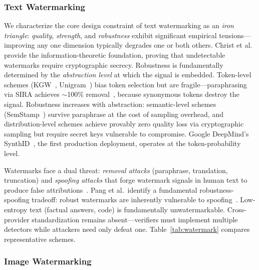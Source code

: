 \subsubsection{Text Watermarking}
\label{sec:wm-text}

We characterize the core design constraint of text watermarking as an \emph{iron triangle}: \emph{quality}, \emph{strength}, and \emph{robustness} exhibit significant empirical tensions---improving any one dimension typically degrades one or both others. Christ et al.~\cite{christ2024undetectable} provide the information-theoretic foundation, proving that undetectable watermarks require cryptographic secrecy. Robustness is fundamentally determined by the \emph{abstraction level} at which the signal is embedded. Token-level schemes (KGW~\cite{kirchenbauer2023kgw}, Unigram~\cite{zhao2023unigram}) bias token selection but are fragile---paraphrasing via SIRA achieves $\sim$100\% removal~\cite{cheng2025sira}, because synonymous tokens destroy the signal. Robustness increases with abstraction: semantic-level schemes (SemStamp~\cite{hou2023semstamp}) survive paraphrase at the cost of sampling overhead, and distribution-level schemes achieve provably zero quality loss via cryptographic sampling but require secret keys vulnerable to compromise. Google DeepMind's SynthID~\cite{synthidtext2024}, the first production deployment, operates at the token-probability level.

Watermarks face a dual threat: \emph{removal attacks} (paraphrase, translation, truncation) and \emph{spoofing attacks} that forge watermark signals in human text to produce false attributions~\cite{sadasivan2023spoofing}. Pang et al.\ identify a fundamental robustness-spoofing tradeoff: robust watermarks are inherently vulnerable to spoofing~\cite{pang2024nofree}. Low-entropy text (factual answers, code) is fundamentally unwatermarkable. Cross-provider standardization remains absent---verifiers must implement multiple detectors while attackers need only defeat one. Table~\ref{tab:watermark} compares representative schemes.

\subsubsection{Image Watermarking}
\label{sec:wm-image}

